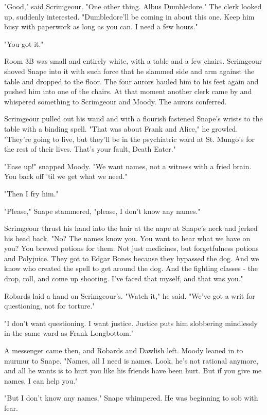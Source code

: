 "Good," said Scrimgeour. "One other thing. Albus Dumbledore." The clerk looked up, suddenly interested. "Dumbledore'll be coming in about this one. Keep him busy with paperwork as long as you can. I need a few hours."

"You got it."

Room 3B was small and entirely white, with a table and a few chairs. Scrimgeour shoved Snape into it with such force that he slammed side and arm against the table and dropped to the floor. The four aurors hauled him to his feet again and pushed him into one of the chairs. At that moment another clerk came by and whispered something to Scrimgeour and Moody. The aurors conferred.

Scrimgeour pulled out his wand and with a flourish fastened Snape's wrists to the table with a binding spell. "That was about Frank and Alice," he growled. "They're going to live, but they'll be in the psychiatric ward at St. Mungo's for the rest of their lives. That's your fault, Death Eater."

"Ease up!" snapped Moody. "We want names, not a witness with a fried brain. You back off 'til we get what we need."

"Then I fry him."

"Please," Snape stammered, "please, I{\el} don't{\el} know any{\el} names."

Scrimgeour thrust his hand into the hair at the nape at Snape's neck and jerked his head back. "No? The names know you. You want to hear what we have on you? You brewed potions for them. Not just medicines, but forgetfulness potions and Polyjuice. They got to Edgar Bones because they bypassed the dog. And we know who created the spell to get around the dog. And the fighting classes - the drop, roll, and come up shooting. I've faced that myself, and that was you."

Robards laid a hand on Scrimgeour's. "Watch it," he said. "We've got a writ for questioning, not for torture."

"I don't want questioning. I want justice. Justice puts him slobbering mindlessly in the same ward as Frank Longbottom."

A messenger came then, and Robards and Dawlish left. Moody leaned in to murmur to Snape. "Names, all I need is names. Look, he's not rational anymore, and all he wants is to hurt you like his friends have been hurt. But if you give me names, I can help you."

"But I don't{\el} know any{\el} names," Snape whimpered. He was beginning to sob with fear.

